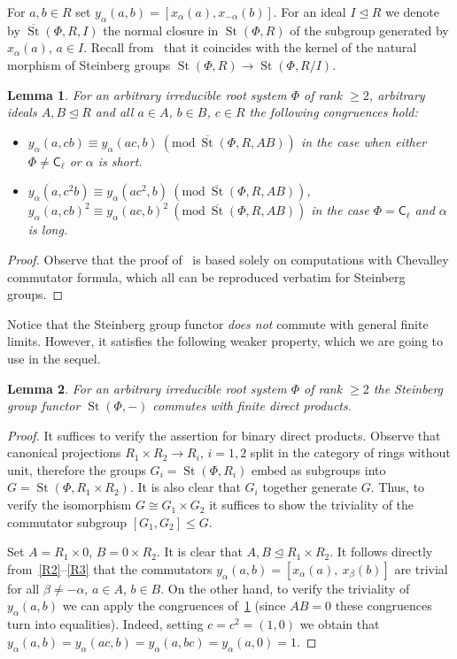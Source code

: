 \documentclass[oneside, 11pt]{amsart} \pdfoutput=1
\newcommand{\St}{\mathop{\mathrm{St}}\nolimits}
\numberwithin{equation}{section}
\newtheorem{lemma}{Lemma} \numberwithin{lemma}{section}
\theoremstyle{definition}
\newcommand{\rC}{\mathsf{C}}
\begin{document}
For $a, b \in R$ set $y_\alpha(a, b) = [x_\alpha(a), x_{-\alpha}(b)]$.
For an ideal $I \trianglelefteq R$ we denote by $\overline{\St}(\Phi, R, I)$ the normal closure in $\St(\Phi, R)$ of the subgroup generated by $x_\alpha(a)$, $a\in I$. Recall from~\cite[Lemma~5]{S15} that it coincides with the kernel of the natural morphism of Steinberg groups $\St(\Phi, R) \to \St(\Phi, R/I)$.

\begin{lemma} \label{lem:c-identities} For an arbitrary irreducible root system $\Phi$ of rank $\geq 2$, arbitrary ideals $A, B \trianglelefteq R$ and all $a \in A$, $b \in B$, $c \in R$ the following congruences hold:
\begin{itemize}
 \item $y_\alpha(a, cb) \equiv y_\alpha(ac, b)\ (\mathrm{mod}\ \overline{\St}(\Phi, R, AB))$ in the case when either $\Phi \neq \rC_{\ell}$ or $\alpha$ is short.
 \item $y_\alpha(a, c^2b) \equiv y_\alpha(ac^2, b)\ (\mathrm{mod}\ \overline{\St}(\Phi, R, AB))$, $y_\alpha(a, cb)^2 \equiv y_\alpha(ac, b)^2\ (\mathrm{mod}\ \overline{\St}(\Phi, R, AB))$ in the case $\Phi = \rC_{\ell}$ and $\alpha$ is long.
\end{itemize} \end{lemma}
\begin{proof}
 Observe that the proof of~\cite[Theorem~5]{VZ20} is based solely on computations with Chevalley commutator formula, which all can be reproduced verbatim for Steinberg groups.
\end{proof}

Notice that the Steinberg group functor {\it does not} commute with general finite limits. However, it satisfies the following weaker property, which we are going to use in the sequel.
\begin{lemma} \label{lem:fprod} For an arbitrary irreducible root system $\Phi$ of rank $\geq 2$ the Steinberg group functor $\St(\Phi, -)$ commutes with finite direct products. \end{lemma}
\begin{proof} 
It suffices to verify the assertion for binary direct products.
Observe that canonical projections $R_1 \times R_2 \to R_i$, $i=1,2$ split in the category of rings without unit, therefore the groups $G_i = \St(\Phi, R_i)$ embed as subgroups into $G = \St(\Phi, R_1 \times R_2)$. It is also clear that $G_i$ together generate $G$. Thus, to verify the isomorphism $G \cong G_1 \times G_2$ it suffices to show the triviality of the commutator subgroup $[G_1, G_2] \leq G$.

Set $A = R_1\times 0$, $B = 0 \times R_2$. It is clear that $A, B \trianglelefteq R_1 \times R_2$. 
It follows directly from~\eqref{R2}--\eqref{R3} that the commutators $y_\alpha(a, b) = [x_{\alpha}(a),\ x_\beta(b)]$ are trivial for all $\beta \neq -\alpha$, $a \in A$, $b\in B$. On the other hand, to verify the triviality of $y_\alpha(a, b)$ we can apply the congruences of~\cref{lem:c-identities} (since $AB=0$ these congruences turn into equalities).
Indeed, setting $c = c^2 = (1, 0)$ we obtain that $y_\alpha(a, b) = y_\alpha(ac, b) = y_\alpha(a, bc) = y_\alpha(a, 0) = 1$. \end{proof}
\end{document}
